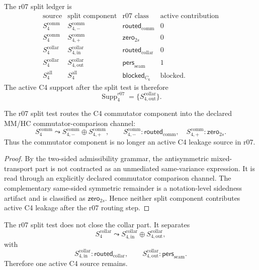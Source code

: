 \begin{definition}
\label{def:v470-r07-c4-split-ledger}
The r07 split ledger is
\[
\begin{array}{c|c|c|c}
\text{source} & \text{split component} & \text{r07 class} & \text{active contribution}\\
\hline
S_4^{\mathrm{comm}} & S_{4,-}^{\mathrm{comm}} & \mathsf{routed}_{\mathrm{comm}} & 0\\
S_4^{\mathrm{comm}} & S_{4,+}^{\mathrm{comm}} & \mathsf{zero}_{2s} & 0\\
S_4^{\mathrm{collar}} & S_{4,\mathrm{in}}^{\mathrm{collar}} & \mathsf{routed}_{\mathrm{collar}} & 0\\
S_4^{\mathrm{collar}} & S_{4,\mathrm{out}}^{\mathrm{collar}} & \mathsf{pers}_{\mathrm{seam}} & 1\\
S_4^{\mathrm{all}} & S_{4}^{\mathrm{all}} & \mathsf{blocked}_{C_6} & \text{blocked}.
\end{array}
\]
The active C4 support after the split test is therefore
\[
\operatorname{Supp}_{4}^{r07}
=
\{S_{4,\mathrm{out}}^{\mathrm{collar}}\}.
\]
\end{definition}

\begin{lemma}
\label{lem:v470-r07-commutator-component-routed}
The r07 split test routes the C4 commutator component into the declared
MM/HC commutator-comparison channel:
\[
S_4^{\mathrm{comm}}
\leadsto
S_{4,-}^{\mathrm{comm}}\oplus S_{4,+}^{\mathrm{comm}},
\qquad
S_{4,-}^{\mathrm{comm}}:\mathsf{routed}_{\mathrm{comm}},
\quad
S_{4,+}^{\mathrm{comm}}:\mathsf{zero}_{2s}.
\]
Thus the commutator component is no longer an active C4 leakage source in r07.
\end{lemma}

\begin{proof}
By the two-sided admissibility grammar, the antisymmetric mixed-transport part
is not contracted as an unmediated same-variance expression.  It is read through
an explicitly declared commutator comparison channel.  The complementary
same-sided symmetric remainder is a notation-level sidedness artifact and is
classified as \(\mathsf{zero}_{2s}\).  Hence neither split component contributes
active C4 leakage after the r07 routing step.
\end{proof}

\begin{lemma}
\label{lem:v470-r07-collar-seam-remains-active}
The r07 split test does not close the collar part.  It separates
\[
S_4^{\mathrm{collar}}
\leadsto
S_{4,\mathrm{in}}^{\mathrm{collar}}
\oplus
S_{4,\mathrm{out}}^{\mathrm{collar}},
\]
with
\[
S_{4,\mathrm{in}}^{\mathrm{collar}}:\mathsf{routed}_{\mathrm{collar}},
\qquad
S_{4,\mathrm{out}}^{\mathrm{collar}}:\mathsf{pers}_{\mathrm{seam}}.
\]
Therefore one active C4 source remains.
\end{lemma}


